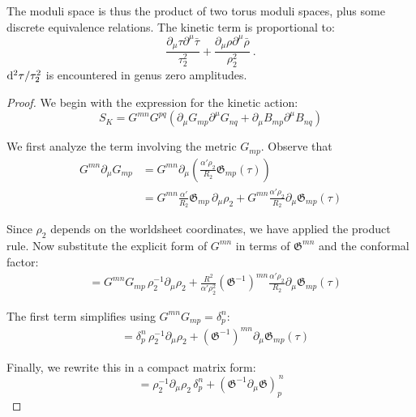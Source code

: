 The moduli space is thus the product of two torus moduli spaces, plus some discrete equivalence relations. 
The kinetic term is proportional to:
\begin{equation}
	\frac{\partial_{\mu} \tau \partial^{\mu} \bar{\tau}}{\tau_{2}^{2}}
	+\frac{\partial_{\mu} \rho \partial^{\mu} \bar{\rho}}{\rho_{2}^{2}} \:. \label{8.4.40}
\end{equation}
$\mathrm{d}^{2} \tau / \tau_{2}^{2}$ is encountered in genus zero amplitudes. 
\begin{tcolorbox}[breakable]
	\begin{proof}
		We begin with the expression for the kinetic action:
		\begin{equation}
			S_K = G^{mn}G^{pq}(\partial_\mu G_{mp}\partial^\mu G_{nq} + \partial_\mu B_{mp}\partial^\mu B_{nq})
		\end{equation}
		
		We first analyze the term involving the metric \(G_{mp}\). Observe that
		\begin{align}
			G^{mn}\partial_\mu G_{mp} 
			&= G^{mn}\partial_\mu \left( \frac{\alpha'\rho_2}{R_2} \mathfrak{G}_{mp}(\tau) \right) \\
			&= G^{mn}\frac{\alpha'}{R_2} \mathfrak{G}_{mp}\,\partial_\mu \rho_2 
			+ G^{mn}\frac{\alpha'\rho_2}{R_2} \partial_\mu \mathfrak{G}_{mp}(\tau)
		\end{align}
		
		Since \(\rho_2\) depends on the worldsheet coordinates, we have applied the product rule. Now substitute the explicit form of \(G^{mn}\) in terms of \(\mathfrak{G}^{mn}\) and the conformal factor:
		\begin{align}
			&= G^{mn}G_{mp}\,\rho_2^{-1}\partial_\mu \rho_2 
			+ \frac{R^2}{\alpha' \rho_2^2} (\mathfrak{G}^{-1})^{mn}\frac{\alpha'\rho_2}{R_2} \partial_\mu \mathfrak{G}_{mp}(\tau)
		\end{align}
		
		The first term simplifies using \(G^{mn}G_{mp} = \delta^n_p\):
		\begin{align}
			&= \delta_p^n\,\rho_2^{-1}\partial_\mu \rho_2 
			+ (\mathfrak{G}^{-1})^{mn}\partial_\mu \mathfrak{G}_{mp}(\tau)
		\end{align}
		
		Finally, we rewrite this in a compact matrix form:
		\begin{equation}
			= \rho_2^{-1}\partial_\mu \rho_2\,\delta_p^n 
			+ (\mathfrak{G}^{-1}\partial_\mu \mathfrak{G})_p^{\,n}
		\end{equation}
		

\end{proof}
\end{tcolorbox}

